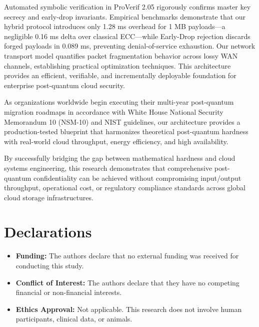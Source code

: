 \documentclass[5p,times]{elsarticle}
\begin{document}
Automated symbolic verification in ProVerif 2.05 rigorously confirms master key secrecy and early-drop invariants. Empirical benchmarks demonstrate that our hybrid protocol introduces only 1.28 ms overhead for 1 MB payloads---a negligible 0.16 ms delta over classical ECC---while Early-Drop rejection discards forged payloads in 0.089 ms, preventing denial-of-service exhaustion. Our network transport model quantifies packet fragmentation behavior across lossy WAN channels, establishing practical optimization techniques. This architecture provides an efficient, verifiable, and incrementally deployable foundation for enterprise post-quantum cloud security.

As organizations worldwide begin executing their multi-year post-quantum migration roadmaps in accordance with White House National Security Memorandum 10 (NSM-10) and NIST guidelines, our architecture provides a production-tested blueprint that harmonizes theoretical post-quantum hardness with real-world cloud throughput, energy efficiency, and high availability.

By successfully bridging the gap between mathematical hardness and cloud systems engineering, this research demonstrates that comprehensive post-quantum confidentiality can be achieved without compromising input/output throughput, operational cost, or regulatory compliance standards across global cloud storage infrastructures.


\FloatBarrier
\section*{Declarations}

\begin{itemize}
  \item \textbf{Funding:} The authors declare that no external funding was received for conducting this study.
\end{itemize}

\begin{itemize}
  \item \textbf{Conflict of Interest:} The authors declare that they have no competing financial or non-financial interests.
\end{itemize}

\begin{itemize}
  \item \textbf{Ethics Approval:} Not applicable. This research does not involve human participants, clinical data, or animals.
\end{itemize}
\end{document}
